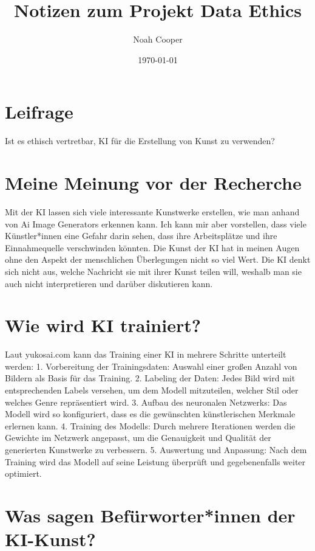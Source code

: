 \documentclass{article}
\title{Notizen zum Projekt Data Ethics}
\author{Noah Cooper}
\date{\today}
\begin{document}
\maketitle


\tableofcontents

\section{Leifrage}
    Ist es ethisch vertretbar, KI für die Erstellung von Kunst zu verwenden?

\section{Meine Meinung vor der Recherche}
    Mit der KI lassen sich viele interessante Kunstwerke erstellen, wie man anhand von Ai Image 
    Generators erkennen kann. Ich kann mir aber vorstellen, dass viele Künstler*innen eine Gefahr 
    darin sehen, dass ihre Arbeitsplätze und ihre Einnahmequelle verschwinden könnten. Die Kunst der KI 
    hat in meinen Augen ohne den Aspekt der menschlichen Überlegungen nicht so viel Wert. Die KI denkt 
    sich nicht aus, welche Nachricht sie mit ihrer Kunst teilen will, weshalb man sie auch nicht 
    interpretieren und darüber diskutieren kann.

\section{Wie wird KI trainiert?}
    Laut yukosai.com kann das Training einer KI in mehrere Schritte unterteilt werden:
    1. Vorbereitung der Trainingsdaten: Auswahl einer großen Anzahl von Bildern als Basis für das Training.
    2. Labeling der Daten: Jedes Bild wird mit entsprechenden Labels versehen, um dem Modell mitzuteilen, welcher Stil oder welches Genre repräsentiert wird.
    3. Aufbau des neuronalen Netzwerks: Das Modell wird so konfiguriert, dass es die gewünschten künstlerischen Merkmale erlernen kann.
    4. Training des Modells: Durch mehrere Iterationen werden die Gewichte im Netzwerk angepasst, um die Genauigkeit und Qualität der generierten Kunstwerke zu verbessern.
    5. Auswertung und Anpassung: Nach dem Training wird das Modell auf seine Leistung überprüft und gegebenenfalls weiter optimiert.


\section{Was sagen Befürworter*innen der KI-Kunst?}




\printbibliography
\end{document}
